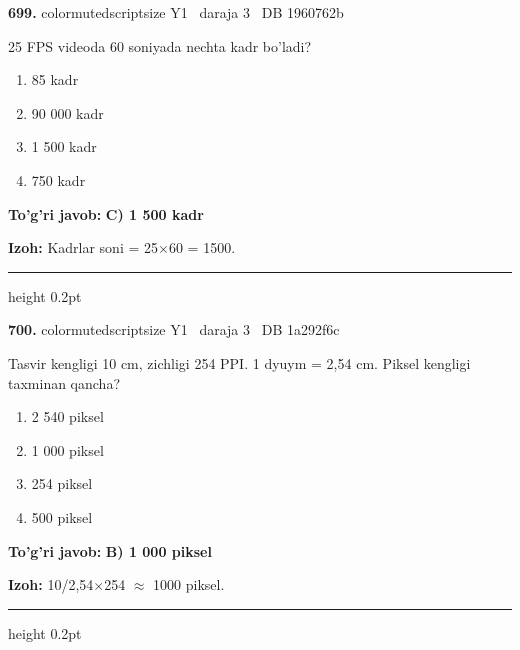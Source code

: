 \documentclass[10pt,a4paper,oneside]{article}
\begin{document}
\noindent\textbf{\color{ink}699.}  {color{muted}scriptsize Y1 \textbullet\ daraja 3 \textbullet\ DB 1960762b}
\par
25 FPS videoda 60 soniyada nechta kadr bo'ladi?
\begin{enumerate}[label=\Alph*),leftmargin=9mm]
\item 85 kadr
\item 90 000 kadr
\item 1 500 kadr
\item 750 kadr
\end{enumerate}
\begin{tcolorbox}[enhanced,breakable,colback=teal!4,colframe=teal!50!black,boxrule=0.5pt,arc=1.1mm,left=3mm,right=3mm,top=1.7mm,bottom=1.7mm,before skip=2mm,after skip=2mm]
\textbf{\color{teal}To'g'ri javob:} \textbf{C) 1 500 kadr}
\par\smallskip
\textbf{Izoh:} Kadrlar soni = 25\ensuremath{\times}60 = 1500.
\end{tcolorbox}
\vspace{2mm}\hrule height 0.2pt \vspace{3mm}

\noindent\textbf{\color{ink}700.}  {color{muted}scriptsize Y1 \textbullet\ daraja 3 \textbullet\ DB 1a292f6c}
\par
Tasvir kengligi 10 cm, zichligi 254 PPI. 1 dyuym = 2,54 cm. Piksel kengligi taxminan qancha?
\begin{enumerate}[label=\Alph*),leftmargin=9mm]
\item 2 540 piksel
\item 1 000 piksel
\item 254 piksel
\item 500 piksel
\end{enumerate}
\begin{tcolorbox}[enhanced,breakable,colback=teal!4,colframe=teal!50!black,boxrule=0.5pt,arc=1.1mm,left=3mm,right=3mm,top=1.7mm,bottom=1.7mm,before skip=2mm,after skip=2mm]
\textbf{\color{teal}To'g'ri javob:} \textbf{B) 1 000 piksel}
\par\smallskip
\textbf{Izoh:} 10/2,54\ensuremath{\times}254 \ensuremath{\approx} 1000 piksel.
\end{tcolorbox}
\vspace{2mm}\hrule height 0.2pt \vspace{3mm}
\end{document}
